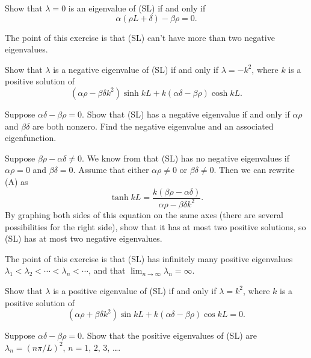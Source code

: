 \begin{exerciselist}


\item\label{exer:13.2.28}Show that $\lambda=0$ is an eigenvalue of (SL)  if and only if
\[
\alpha(\rho L+\delta)-\beta\rho =0.
\]


\item\label{exer:13.2.29}\Lex
The point of this exercise is that (SL) can't have more than two negative
eigenvalues.
\begin{alist}
\item Show that $\lambda$ is a negative eigenvalue of (SL)
if and only if $\lambda=-k^{2}$, where $k$  is a positive solution of
\[
(\alpha\rho-\beta\delta k^{2})\sinh kL+k(\alpha\delta-\beta\rho)\cosh kL.
\]
\item Suppose $\alpha\delta-\beta\rho=0$.  Show that (SL)
has a negative eigenvalue if and only if $\alpha\rho$ and $\beta\delta$
are both nonzero. Find the negative eigenvalue and an associated
eigenfunction. 
\item Suppose $\beta\rho-\alpha\delta\ne0$. We know from
 that (SL) has no negative eigenvalues
if $\alpha\rho=0$ and $\beta\delta=0$. Assume that either $\alpha\rho\ne0$
or $\beta\delta\ne0$. Then we can rewrite (A) as
\[
\tanh kL=
\frac{k(\beta\rho-\alpha\delta)}{\alpha\rho-\beta\delta k^{2}}.
\]
By graphing both sides of this equation on the same axes (there are
several possibilities for the right side), show that it has at most
two positive solutions, so (SL) has at most two negative eigenvalues.
\end{alist}

\item\label{exer:13.2.30}\Lex
The point of this exercise is that (SL) has infinitely many positive
eigenvalues $\lambda_{1}<\lambda_{2}<\cdots<\lambda_{n}<\cdots$, and
that $\lim_{n\to\infty}\lambda_{n}=\infty$.
\begin{alist}
\item Show that $\lambda$ is a positive eigenvalue of (SL)
if and only if $\lambda=k^{2}$, where $k$ is a positive solution of
\[\tag{A}
(\alpha\rho+\beta\delta k^{2})\sin kL+k(\alpha\delta-\beta\rho)\cos kL=0.
\]
\item Suppose $\alpha\delta-\beta\rho=0$. Show that the positive
eigenvalues
 of (SL) are $\lambda_{n}=(n\pi/L)^{2}$, $n=1$, $2$, $3$, \dots.


\end{alist}
\end{exerciselist}
